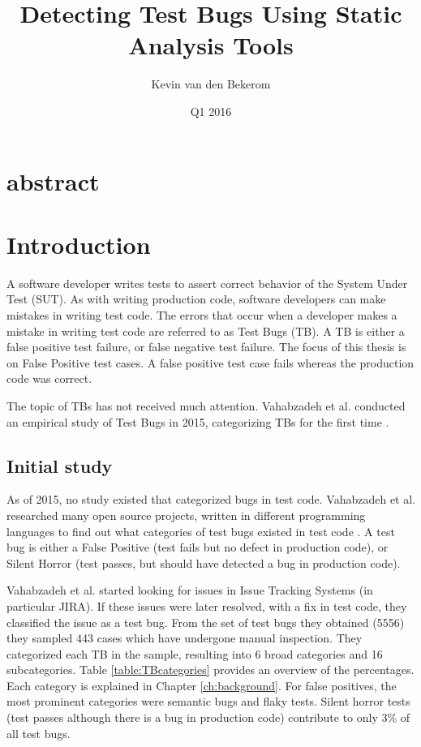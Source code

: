 \documentclass{uvamscse}
\title{Detecting Test Bugs Using Static Analysis Tools}
\subtitle{}
\date{Q1 2016}
\author{Kevin van den Bekerom}
\newcommand{\Atestbugs}{Vahabzadeh et al.}
\begin{document}
\maketitle

\chapter*{abstract}

\chapter{Introduction}
A software developer writes tests to assert correct behavior of the System Under Test (SUT). As with writing production code, software developers can make mistakes in writing test code. The errors that occur when a developer makes a mistake in writing test code are referred to as Test Bugs (TB). A TB is either a false positive test failure, or false negative test failure. The focus of this thesis is on False Positive test cases. A false positive test case fails whereas the production code was correct.

The topic of TBs has not received much attention. \Atestbugs{} conducted an empirical study of Test Bugs in 2015, categorizing TBs for the first time \cite{vahabzadeh2015empirical}.  

\section{Initial study}
As of 2015, no study existed that categorized bugs in test code. \Atestbugs{} researched many open source projects, written in different programming languages to find out what categories of test bugs existed in test code \cite{vahabzadeh2015empirical}. A test bug is either a False Positive (test fails but no defect in production code), or Silent Horror (test passes, but should have detected a bug in production code). 

\Atestbugs{} started looking for issues in Issue Tracking Systems (in particular JIRA). If these issues were later resolved, with a fix in test code, they classified the issue as a test bug. From the set of test bugs they obtained (5556) they sampled 443 cases which have undergone manual inspection. They categorized each TB in the sample, resulting into 6 broad categories and 16 subcategories. Table \ref{table:TBcategories} provides an overview of the percentages. Each category is explained in Chapter \ref{ch:background}. For false positives, the most prominent categories were semantic bugs and flaky tests. Silent horror tests (test passes although there is a bug in production code) contribute to only 3\% of all test bugs.
\end{document}
